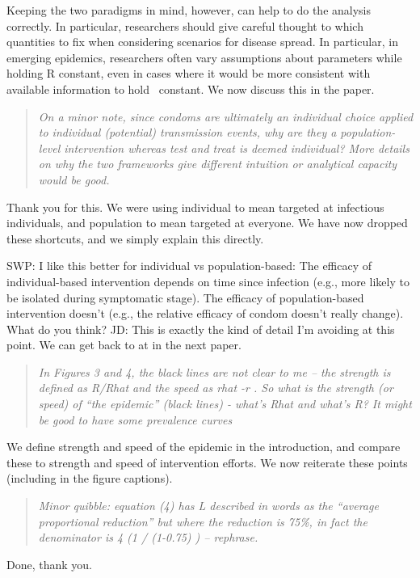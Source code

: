 Keeping the two paradigms in mind, however, can help to do the analysis correctly. 
In particular, researchers should give careful thought to which quantities to fix when considering scenarios for disease spread. 
In particular, in emerging epidemics, researchers often vary assumptions about parameters while holding R constant, even in cases where it would be more consistent with available information to hold \rr\ constant.
We now discuss this in the paper.

\begin{quote}\sl
On a minor note, since condoms are ultimately an individual choice
applied to individual (potential) transmission events, why are they a
population-level intervention whereas test and treat is deemed
individual? More details on why the two frameworks give different
intuition or analytical capacity would be good.
\end{quote}

Thank you for this. We were using individual to mean targeted at
infectious individuals, and population to mean targeted at everyone. We
have now dropped these shortcuts, and we simply explain this directly.

SWP: I like this better for individual vs population-based: The efficacy
of individual-based intervention depends on time since infection (e.g.,
more likely to be isolated during symptomatic stage). The efficacy of
population-based intervention doesn't (e.g., the relative efficacy of
condom doesn't really change). What do you think?
JD: This is exactly the kind of detail I'm avoiding at this point. We can get back to at in the next paper.

\begin{quote}\sl
In Figures 3 and 4, the black lines are not clear to me -- the strength
is defined as R/Rhat and the speed as rhat -r . So what is the strength
(or speed) of ``the epidemic'' (black lines) - what's Rhat and what's R?
It might be good to have some prevalence curves
\end{quote}

We define strength and speed of the epidemic in the introduction, and
compare these to strength and speed of intervention efforts. We now
reiterate these points (including in the figure captions).

\begin{quote}\sl
Minor quibble: equation (4) has L described in words as the ``average
proportional reduction'' but where the reduction is 75\%, in fact the
denominator is 4 (1 / (1-0.75) ) -- rephrase.
\end{quote}

Done, thank you.

